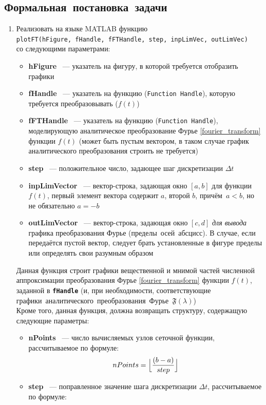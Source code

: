 \documentclass[11pt, oneside, draft]{article}
\numberwithin{equation}{section}
\newcommand \bitem[1][]{
\item \textbf{#1}}
\newcommand \four[1][\lambda]{\mathfrak{F}(#1)}
\begin{document}
    \subsection{Формальная~постановка~задачи} 
    \begin{enumerate}
        \item Реализовать на языке MATLAB функцию \\\texttt{plotFT(hFigure,~fHandle,~fFTHandle,~step,~inpLimVec,~outLimVec)} \\со следующими параметрами: 
        \begin{itemize}
            \bitem[hFigure] ~--- указатель на фигуру, в которой требуется отобразить графики \bitem[fHandle] ~--- указатель на функцию (\texttt{Function Handle}), которую требуется преобразовывать (\(f(t)\)) \bitem[fFTHandle] ~--- указатель на функцию (\texttt{Function Handle}), моделирующую аналитическое преобразование Фурье \eqref{fourier_transform} функции \(f(t)\) (может быть пустым вектором, в таком случае график аналитического преобразования строить не требуется) \bitem[step] ~--- положительное число, задающее шаг дискретизации \(\Delta t\) \bitem[inpLimVector] ~--- вектор-строка, задающая окно \([a, b]\) для функции \(f(t)\), первый элемент вектора содержит \(a\), второй \(b\), причём~\(a < b\), но не обязательно \(a = -b\) \bitem[outLimVector] ~--- вектор-строка, задающая окно \([c, d]\) \textit{для вывода} графика преобразования Фурье (пределы~осей~абсцисс). В случае, если передаётся пустой вектор, следует брать установленные в фигуре пределы или определять свои разумным образом 
        \end{itemize}
        Данная функция строит графики вещественной и мнимой частей численной аппроксимации преобразования Фурье \eqref{fourier_transform} функции \(f(t)\), заданной в \textbf{\texttt{fHandle}} (и, при необходимости, соответствующие графики~аналитического~преобразования~Фурье~\(\four\)) \\
        Кроме того, данная функция, должна возвращать структуру, содержащую следующие параметры: 
        \begin{itemize}
            \bitem[nPoints] ~--- число вычисляемых узлов сеточной функции, рассчитываемое по формуле:
            \begin{equation}
            \label{eq:npoints}
                nPoints = \Bigl\lfloor {\dfrac{(b - a)}{step}}\Bigr\rfloor 
            \end{equation}
            \bitem[step] ~--- поправленное значение шага дискретизации \(\Delta t\), рассчитываемое по формуле:

\end{itemize}
\end{enumerate}
\end{document}
